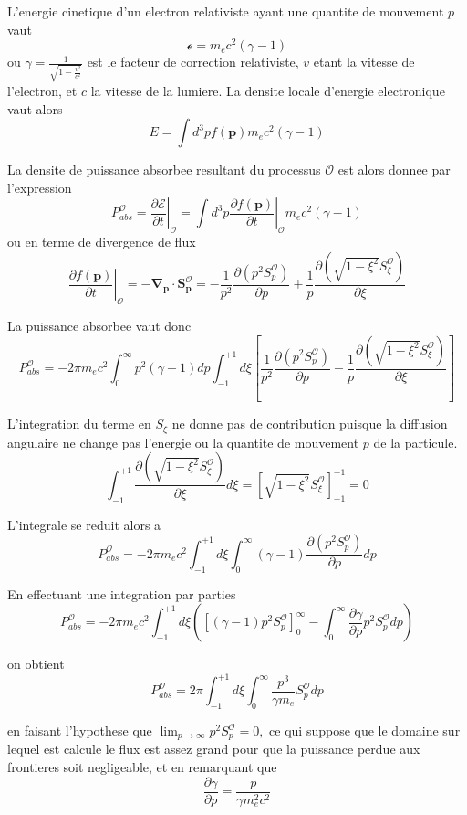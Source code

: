 
L'energie cinetique d'un electron relativiste ayant une quantite de
mouvement $p$ vaut \[ \mathcal{e}=m_{e}c^{2}\left(\gamma-1\right)\]
 ou $\gamma=\frac{1}{\sqrt{1-\frac{v^{2}}{c^{2}}}}$ est le facteur
de correction relativiste, $v$ etant la vitesse de l'electron, et
$c$ la vitesse de la lumiere. La densite locale d'energie electronique
vaut alors \[
E=\int d^{3}pf\left(\mathbf{p}\right)m_{e}c^{2}\left(\gamma-1\right)\]


La densite de puissance absorbee resultant du processus $\mathcal{O}$
est alors donnee par l'expression \[
P_{abs}^{\mathcal{O}}=\left.\frac{\partial\mathcal{E}}{\partial t}\right|_{\mathcal{O}}=\int d^{3}p\left.\frac{\partial f\left(\mathbf{p}\right)}{\partial t}\right|_{\mathcal{O}}m_{e}c^{2}\left(\gamma-1\right)\]
 ou en terme de divergence de flux \[
\left.\frac{\partial f\left(\mathbf{p}\right)}{\partial t}\right|_{\mathcal{O}}=-\mathbf{\nabla}_{\mathbf{p}}\cdot\mathbf{S}_{\mathbf{p}}^{\mathcal{O}}=-\frac{1}{p^{2}}\frac{\partial\left(p^{2}S_{p}^{\mathcal{O}}\right)}{\partial p}+\frac{1}{p}\frac{\partial\left(\sqrt{1-\xi^{2}}S_{\xi}^{\mathcal{O}}\right)}{\partial\xi}\]


La puissance absorbee vaut donc \[
P_{abs}^{\mathcal{O}}=-2\pi m_{e}c^{2}\int_{0}^{\infty}p^{2}\left(\gamma-1\right)dp\int_{-1}^{+1}d\xi\left[\frac{1}{p^{2}}\frac{\partial\left(p^{2}S_{p}^{\mathcal{O}}\right)}{\partial p}-\frac{1}{p}\frac{\partial\left(\sqrt{1-\xi^{2}}S_{\xi}^{\mathcal{O}}\right)}{\partial\xi}\right]\]


L'integration du terme en $S_{\xi}$ ne donne pas de contribution
puisque la diffusion angulaire ne change pas l'energie ou la quantite
de mouvement $p$ de la particule. \[
\int_{-1}^{+1}\frac{\partial\left(\sqrt{1-\xi^{2}}S_{\xi}^{\mathcal{O}}\right)}{\partial\xi}d\xi=\left[\sqrt{1-\xi^{2}}S_{\xi}^{\mathcal{O}}\right]_{-1}^{+1}=0\]


L'integrale se reduit alors a \[
P_{abs}^{\mathcal{O}}=-2\pi m_{e}c^{2}\int_{-1}^{+1}d\xi\int_{0}^{\infty}\left(\gamma-1\right)\frac{\partial\left(p^{2}S_{p}^{\mathcal{O}}\right)}{\partial p}dp\]


En effectuant une integration par parties \[
P_{abs}^{\mathcal{O}}=-2\pi m_{e}c^{2}\int_{-1}^{+1}d\xi\left(\left[\left(\gamma-1\right)p^{2}S_{p}^{\mathcal{O}}\right]_{0}^{\infty}-\int_{0}^{\infty}\frac{\partial\gamma}{\partial p}p^{2}S_{p}^{\mathcal{O}}dp\right)\]


on obtient \[
P_{abs}^{\mathcal{O}}=2\pi\int_{-1}^{+1}d\xi\int_{0}^{\infty}\frac{p^{3}}{\gamma m_{e}}S_{p}^{\mathcal{O}}dp\]


en faisant l'hypothese que $\lim_{p\rightarrow\infty}p^{2}S_{p}^{\mathcal{O}}=0,$
ce qui suppose que le domaine sur lequel est calcule le flux est assez
grand pour que la puissance perdue aux frontieres soit negligeable,
et en remarquant que \[
\frac{\partial\gamma}{\partial p}=\frac{p}{\gamma m_{e}^{2}c^{2}}\]
